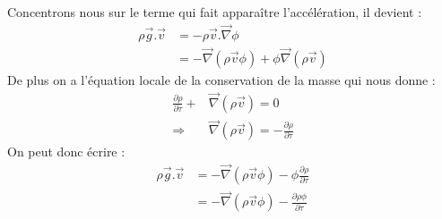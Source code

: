 Concentrons nous sur le terme qui fait apparaître l'accélération, il devient :
\begin{align}
     \rho \vec{g}.\vec{v} &= -\rho \vec{v}.\vec{\nabla}\phi\\
                         &= -\vec{\nabla}\left(\rho \vec{v} \phi \right) + \phi \vec{\nabla}\left(\rho \vec{v} \right)
\end{align}
De plus on a l'équation locale de la conservation de la masse qui nous donne :
\begin{align}
    \frac{\partial \rho}{\partial \tau} +&\vec{\nabla}\left(\rho \vec{v} \right) = 0 \\
    \Rightarrow & \vec{\nabla}\left(\rho \vec{v} \right) = -\frac{\partial \rho}{\partial \tau}
\end{align}
On peut donc écrire :
\begin{align}
    \rho \vec{g}.\vec{v} &=  -\vec{\nabla}\left(\rho \vec{v} \phi \right) - \phi\frac{\partial \rho}{\partial \tau}\\
    & = -\vec{\nabla}\left(\rho \vec{v} \phi \right) - \frac{\partial \rho \phi}{\partial \tau}
\end{align}

